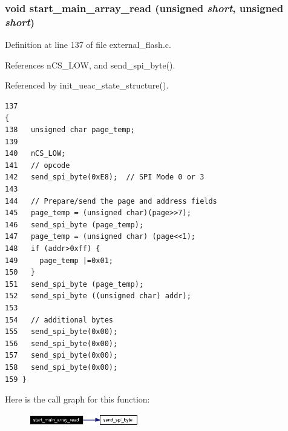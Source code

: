 \subsubsection{\setlength{\rightskip}{0pt plus 5cm}void start\_\-main\_\-array\_\-read (unsigned {\em short}, unsigned {\em short})}\label{external__flash_8h_a7}




Definition at line 137 of file external\_\-flash.c.

References n\-CS\_\-LOW, and send\_\-spi\_\-byte().

Referenced by init\_\-ueac\_\-state\_\-structure().

\footnotesize\begin{verbatim}137                                                                     {
138   unsigned char page_temp; 
139 
140   nCS_LOW;
141   // opcode
142   send_spi_byte(0xE8);  // SPI Mode 0 or 3  
143 
144   // Prepare/send the page and address fields
145   page_temp = (unsigned char)(page>>7);
146   send_spi_byte (page_temp);
147   page_temp = (unsigned char) (page<<1);
148   if (addr>0xff) {
149     page_temp |=0x01;
150   }
151   send_spi_byte (page_temp);
152   send_spi_byte ((unsigned char) addr);
153 
154   // additional bytes
155   send_spi_byte(0x00);
156   send_spi_byte(0x00);
157   send_spi_byte(0x00);
158   send_spi_byte(0x00);
159 }
\end{verbatim}\normalsize 




Here is the call graph for this function:\begin{figure}[H]
\begin{center}
\leavevmode
\includegraphics[width=136pt]{external__flash_8h_a7_cgraph}
\end{center}
\end{figure}
